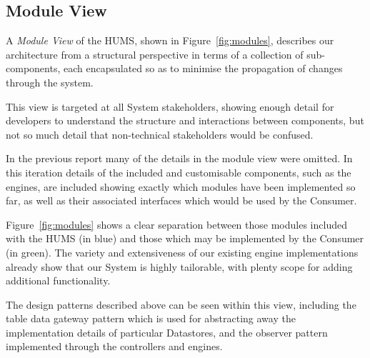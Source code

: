 \documentclass[10pt,a4paper]{article}
\begin{document}
\subsection{Module View}
\label{sec:views}
A \emph{Module View} of the HUMS, shown in Figure~\ref{fig:modules}, describes our architecture from a structural perspective in terms of a collection of sub-components, each encapsulated so as to minimise the propagation of changes through the system. %

This view is targeted at all System stakeholders, showing enough detail for developers to understand the structure and interactions between components, but not so much detail that non-technical stakeholders would be confused.

In the previous report many of the details in the module view were omitted. In this iteration details of the included and customisable components, such as the engines, are included showing exactly which modules have been implemented so far, as well as their associated interfaces which would be used by the Consumer. 

Figure~\ref{fig:modules} shows a clear separation between those modules included with the HUMS (in blue) and those which may be implemented by the Consumer (in green). The variety and extensiveness of our existing engine implementations already show that our System is highly tailorable, with plenty scope for adding additional functionality.

The design patterns described above can be seen within this view, including the table data gateway pattern which is used for abstracting away the implementation details of particular Datastores, and the observer pattern implemented through the controllers and engines.
\end{document}
